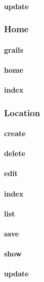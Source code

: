 \documentclass[12pt]{article}
\begin{document}
\paragraph{update}

\subsubsection{Home}
\paragraph{grails}
\paragraph{home}
\paragraph{index}

\subsubsection{Location}
\paragraph{create}
\paragraph{delete}
\paragraph{edit}
\paragraph{index}
\paragraph{list}
\paragraph{save}
\paragraph{show}
\paragraph{update}
\end{document}
